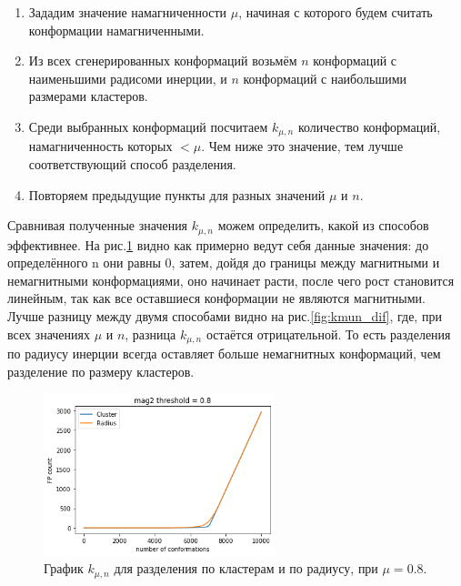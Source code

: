 \begin{enumerate}
	\item Зададим значение намагниченности $\mu$, начиная с которого будем считать конформации намагниченными.
	\item Из всех сгенерированных конформаций возьмём $n$ конформаций с наименьшими радисоми инерции, и $n$ конформаций с наибольшими размерами кластеров.
	\item Среди выбранных конформаций посчитаем $k_{\mu, n}$ количество конформаций, намагниченность которых $< \mu$. Чем ниже это значение, тем лучше соответствующий способ разделения.
	\item Повторяем предыдущие пункты для разных значений $\mu$ и $n$.
\end{enumerate}

Сравнивая полученные значения $k_{\mu, n}$ можем определить, какой из способов эффективнее. На рис.\ref{fig:kmun_example} видно как примерно ведут себя данные значения: до определённого n они равны 0, затем, дойдя до границы между магнитными и немагнитными конформациями, оно начинает расти, после чего рост становится линейным, так как все оставшиеся конформации не являются магнитными. 
Лучше разницу между двумя способами видно на рис.\ref{fig:kmun_dif}, где, при всех значениях $\mu$ и $n$, разница $k_{\mu, n}$ остаётся отрицательной. То есть разделения по радиусу инерции всегда оставляет больше немагнитных конформаций, чем разделение по размеру кластеров.

\begin{figure}[ht]
	\centering
	\includegraphics[width=0.6\textwidth]{../images/cluster_and_radius_mu0.8.png} 
	\caption{График $k_{\mu, n}$ для разделения по кластерам и по радиусу, при $\mu = 0.8$.}
	\label{fig:kmun_example}
\end{figure}

